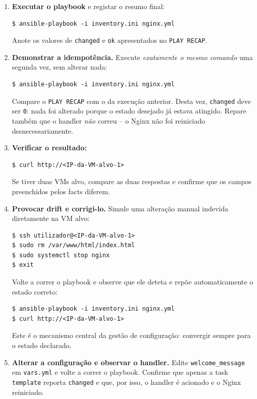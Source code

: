 \documentclass[11pt,a4paper]{article}
\begin{document}
\begin{enumerate}[label=\arabic*.,resume]
  \item \textbf{Executar o playbook} e registar o resumo final:
\begin{lstlisting}
$ ansible-playbook -i inventory.ini nginx.yml
\end{lstlisting}
  Anote os valores de \texttt{changed} e \texttt{ok} apresentados no \texttt{PLAY RECAP}.

  \item \textbf{Demonstrar a idempotência.} Execute \emph{exatamente o mesmo comando} uma segunda vez, sem alterar nada:
\begin{lstlisting}
$ ansible-playbook -i inventory.ini nginx.yml
\end{lstlisting}
  Compare o \texttt{PLAY RECAP} com o da execução anterior. Desta vez, \texttt{changed} deve ser \texttt{0}: nada foi alterado porque o estado desejado já estava atingido. Repare também que o handler \emph{não} correu -- o Nginx não foi reiniciado desnecessariamente.

  \item \textbf{Verificar o resultado:}
\begin{lstlisting}
$ curl http://<IP-da-VM-alvo-1>
\end{lstlisting}
  Se tiver duas VMs alvo, compare as duas respostas e confirme que os campos preenchidos pelos facts diferem.

  \item \textbf{Provocar drift e corrigi-lo.} Simule uma alteração manual indevida diretamente na VM alvo:
\begin{lstlisting}
$ ssh utilizador@<IP-da-VM-alvo-1>
$ sudo rm /var/www/html/index.html
$ sudo systemctl stop nginx
$ exit
\end{lstlisting}
  Volte a correr o playbook e observe que ele deteta e repõe automaticamente o estado correto:
\begin{lstlisting}
$ ansible-playbook -i inventory.ini nginx.yml
$ curl http://<IP-da-VM-alvo-1>
\end{lstlisting}
  Este é o mecanismo central da gestão de configuração: convergir sempre para o estado declarado.

  \item \textbf{Alterar a configuração e observar o handler.} Edite \texttt{welcome\_message} em \texttt{vars.yml} e volte a correr o playbook. Confirme que apenas a task \texttt{template} reporta \texttt{changed} e que, por isso, o handler é acionado e o Nginx reiniciado.

\end{enumerate}
\end{document}
